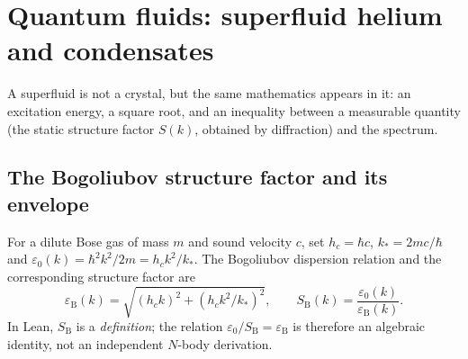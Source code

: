 \section{Quantum fluids: superfluid helium and condensates}\label{ch3:sec:fluides}
A superfluid is not a crystal, but the same mathematics appears in it: an excitation energy, a square root,
and an inequality between a measurable quantity (the static structure factor $S(k)$, obtained by diffraction) and the
spectrum.

\subsection{The Bogoliubov structure factor and its envelope}\label{ch3:sec:bog}
For a dilute Bose gas of mass $m$ and sound velocity $c$, set $h_c=\hbar c$, $k_*=2mc/\hbar$ and
$\varepsilon_0(k)=\hbar^2k^2/2m=h_ck^2/k_*$. The Bogoliubov dispersion relation and the corresponding structure factor
are
\[
\varepsilon_{\mathrm B}(k)=\sqrt{(h_ck)^2+(h_ck^2/k_*)^2},\qquad S_{\mathrm B}(k)=\frac{\varepsilon_0(k)}{\varepsilon_{\mathrm B}(k)} .
\]
In Lean, $S_{\mathrm B}$ is a \emph{definition}; the relation $\varepsilon_0/S_{\mathrm B}=\varepsilon_{\mathrm B}$ is
therefore an algebraic identity, not an independent $N$-body derivation.

